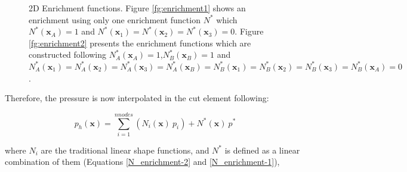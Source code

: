 \documentclass[a4paper,conference]{IEEEtran}
\newcommand{\xx}{\mathbf{x}}
\begin{document}
      
  \begin{figure}[H]
  \centering
   \caption{2D Enrichment functions. Figure \ref{fg:enrichment1} shows an enrichment using only one enrichment function $N^*$ which $N^*(\xx_A)=1$ and $N^*(\xx_1)=N^*(\xx_2)=N^*(\xx_3)=0$. Figure \ref{fg:enrichment2} presents the enrichment functions which are constructed following $N_A^*(\xx_A)=1$,$N_B^*(\xx_B)=1$ and $N_A^*(\xx_1)=N_A^*(\xx_2)=N_A^*(\xx_3)=N_A^*(\xx_B)=N_B^*(\xx_1)=N_B^*(\xx_2)=N_B^*(\xx_3)=N_B^*(\xx_A)=0$ .}
   \label{fg:enrichment}                %
\end{figure}

   Therefore, the pressure is now interpolated in the cut element following:
   
   \begin{equation}
      p_h(\xx) = \sum_{i=1}^{nnodes} (N_i(\xx) \ p_i) + N^*(\xx) \ p^*
   \end{equation}

   where $N_i$ are the traditional linear shape functions, and $N^*$ is defined as a linear combination of them (Equations \ref{N_enrichment-2} and \ref{N_enrichment-1}), 
   
\end{document}
